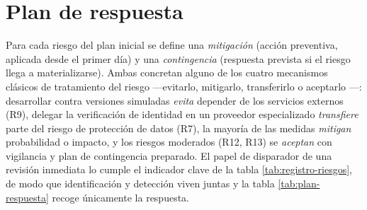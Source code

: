 \section{Plan de respuesta}
\label{sec:riesgos-plan}

Para cada riesgo del plan inicial se define una \emph{mitigación} (acción preventiva, aplicada desde el primer día) y una \emph{contingencia} (respuesta prevista si el riesgo llega a materializarse).
Ambas concretan alguno de los cuatro mecanismos clásicos de tratamiento del riesgo —evitarlo, mitigarlo, transferirlo o aceptarlo \parencite{iso-31000}—: desarrollar contra versiones simuladas \emph{evita} depender de los servicios externos (R9), delegar la verificación de identidad en un proveedor especializado \emph{transfiere} parte del riesgo de protección de datos (R7), la mayoría de las medidas \emph{mitigan} probabilidad o impacto, y los riesgos moderados (R12, R13) se \emph{aceptan} con vigilancia y plan de contingencia preparado.
El papel de disparador de una revisión inmediata lo cumple el indicador clave de la tabla \ref{tab:registro-riesgos}, de modo que identificación y detección viven juntas y la tabla \ref{tab:plan-respuesta} recoge únicamente la respuesta.

